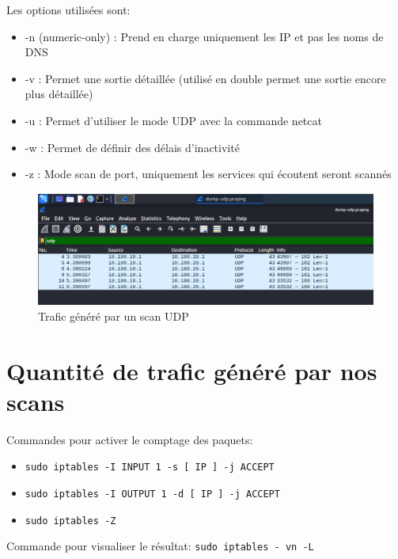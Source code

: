 \documentclass[french,paper=a4,oneside,captions=tableheading]{article}
\begin{document}
Les options utilisées sont:
\begin{itemize}
    \item -n (numeric-only) : Prend en charge uniquement les IP et pas les noms de DNS 
    \item -v : Permet une sortie détaillée (utilisé en double permet une sortie encore plus détaillée) 
    \item -u : Permet d'utiliser le mode UDP avec la commande netcat
    \item -w : Permet de définir des délais d'inactivité
    \item -z : Mode scan de port, uniquement les services qui écoutent seront scannés
\end{itemize}

\begin{figure}[H]
    \centering
    \includegraphics[width=0.90\linewidth]{images/scan-udp.png}
    \caption{Trafic généré par un scan UDP}
    \label{fig:scanudp}
\end{figure}















\section{Quantité de trafic généré par nos scans}

Commandes pour activer le comptage des paquets:
\begin{itemize}
    \item \texttt{sudo iptables -I INPUT 1 -s [ IP ] -j ACCEPT}
    \item \texttt{sudo iptables -I OUTPUT 1 -d [ IP ] -j ACCEPT}
    \item \texttt{sudo iptables -Z}
\end{itemize}

Commande pour visualiser le résultat: \texttt{sudo iptables - vn -L}
\end{document}
